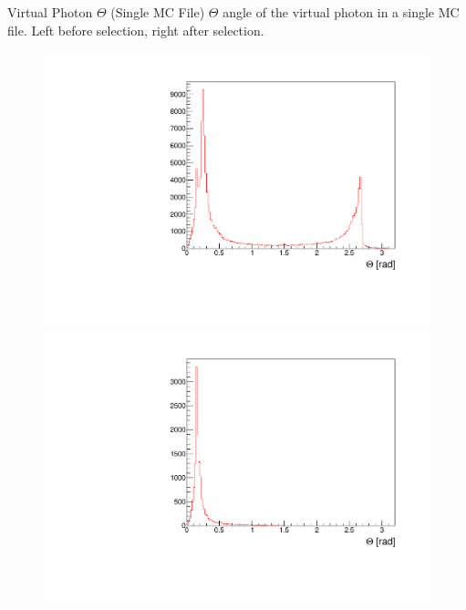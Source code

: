 \documentclass[10pt]{beamer}
\begin{document}
\begin{frame}{Virtual Photon $\Theta$ (Single MC File)}
	$\Theta$ angle of the virtual photon in a single MC file. Left before selection, right after selection.
	
	\begin{figure}
		\centering
		\begin{minipage}{.5\textwidth}
			\centering
			\includegraphics[width=\textwidth]{gg/Thetagg_BS}
			
		\end{minipage}%
		\begin{minipage}{.5\textwidth}
			\centering
			\includegraphics[width=\textwidth]{gg/Thetagg_AS}
			
		\end{minipage}
	\end{figure}
\end{frame}
\end{document}
